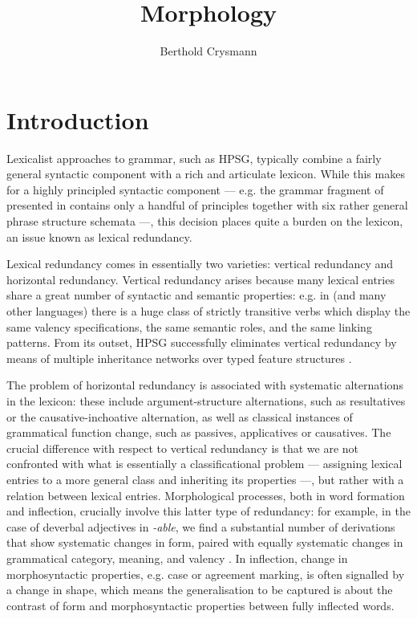 \documentclass[output=paper
	        ,collection
	        ,collectionchapter
 	        ,biblatex
                ,babelshorthands
                ,newtxmath
                ,draftmode
                ,colorlinks, citecolor=brown
]{langscibook}
\author{Berthold Crysmann\affiliation{CNRS, Laboratoire de
    linguistique formelle, U Paris}
}
\title{Morphology}
\begin{document}
\maketitle

\label{chap-morphology}




\section{Introduction}
\label{morphology-sec:Intro}

Lexicalist approaches to grammar, such as HPSG, typically combine a
fairly general syntactic component with a rich and articulate
lexicon. While this makes for a highly principled syntactic
component --- e.g. the grammar fragment of  presented in
\citet{Pollard94} contains only a handful of principles together with
six rather general phrase structure schemata ---, this decision places
quite a burden on the lexicon, an issue  known as lexical
redundancy.

Lexical redundancy comes in essentially two varieties: vertical redundancy
and horizontal redundancy. Vertical redundancy arises because many
lexical entries share a great number of syntactic and semantic
properties: e.g. in  (and many other languages) there is a huge
class of strictly transitive verbs which display the same valency
specifications, the same semantic roles, and the same linking
patterns. From its outset, HPSG successfully eliminates vertical
redundancy by means of multiple inheritance networks over typed
feature structures \citep{Flickinger:Pollard:ea:85a}.

The problem of horizontal redundancy is associated with systematic
alternations in the lexicon: these include argument-structure
alternations, such as resultatives or the causative-inchoative
alternation, as well as classical instances of grammatical function
change, such as passives, applicatives or causatives. The crucial
difference with respect to vertical redundancy is that we are not
confronted with what is essentially a classificational problem ---
assigning lexical entries to a more general class and inheriting its
properties ---, but rather with a relation between lexical entries.
Morphological processes, both in word formation and inflection,
crucially involve this latter type of redundancy: for example, in the
case of deverbal adjectives in \textit{-able}, we find a substantial
number of derivations that show systematic changes in form, paired
with equally systematic changes in grammatical category, meaning, and
valency \citep{Riehemann98}. In inflection, change in morphosyntactic
properties, e.g. case or agreement marking, is often signalled by a
change in shape, which means the generalisation to be captured is about the
contrast of form and morphosyntactic properties between fully
inflected words.
\end{document}
